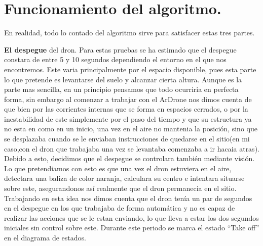 \section{Funcionamiento del algoritmo.}
\hspace{1cm} En realidad, todo lo contado del algoritmo sirve para satisfacer estas tres partes. 

\hspace{1cm} \textbf{El despegue} del dron. Para estas pruebas se ha estimado que el despegue constara de entre 5 y 10 segundos dependiendo el entorno en el que nos encontremos. Este varia principalmente por el espacio disponible, pues esta parte lo que pretende es levantarse del suelo y alcanzar cierta altura. Aunque es la parte mas sencilla, en un principio pensamos que todo ocurriria en perfecta forma, sin embargo al comenzar a trabajar con el ArDrone nos dimos cuenta de que bien por las corrientes internas que se forma en espacios cerrados, o por la inestabilidad de este simplemente por el paso del tiempo y que su estructura ya no esta en como en un inicio, una vez en el aire no mantenia la posici\'on, sino que se desplazaba cuando se le enviaban instrucciones de quedarse en el sitio(en mi caso,con el dron que trabajaba una vez se levantaba comenzaba a ir hacaia atras). Debido a esto, decidimos que el despegue se controlara tambi\'en mediante visi\'on. Lo que pretendiamos con esto es que una vez el dron estuviera en el aire, detectara una baliza de color naranja, calculara su centro e intentara situarse sobre este, asegurandonos as\'i realmente que el dron permanecia en el sitio. Trabajando en esta idea nos dimos cuenta que el dron ten\'ia un par de segundos en el despegue en los que trabajaba de forma autom\'atica y no es capaz de realizar las acciones que se le estan enviando, lo que lleva a estar los dos segundos iniciales sin control sobre este. Durante este periodo se marca el estado "`Take off"' en el diagrama de estados.

